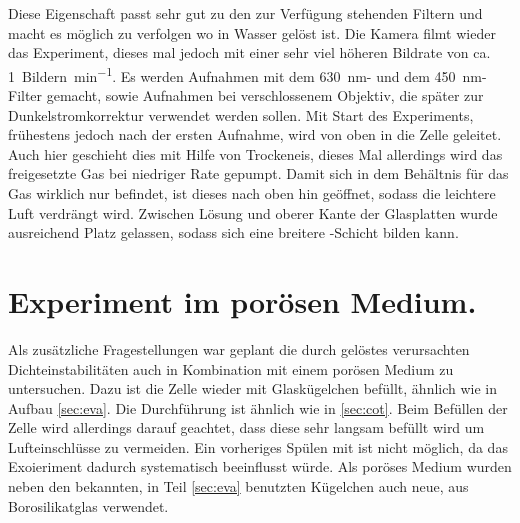 Diese Eigenschaft passt sehr gut zu den zur Verfügung stehenden Filtern und macht es möglich zu verfolgen wo \COT in Wasser gelöst ist.
Die Kamera filmt wieder das Experiment, dieses mal jedoch mit einer sehr viel höheren Bildrate von ca. \SI{1}{Bildern\per\minute}.  Es werden Aufnahmen mit dem \SI{630}{\nano\meter}- und dem \SI{450}{\nano\meter}-Filter gemacht, sowie Aufnahmen bei verschlossenem Objektiv, die später zur Dunkelstromkorrektur verwendet werden sollen. 
Mit Start des Experiments, frühestens jedoch nach der ersten Aufnahme, wird von oben \COT in die Zelle geleitet. Auch hier geschieht dies mit Hilfe von Trockeneis, dieses Mal allerdings wird das freigesetzte Gas bei niedriger Rate gepumpt. Damit sich in dem Behältnis für das Gas wirklich nur \COT befindet, ist dieses nach oben hin geöffnet, sodass die leichtere Luft verdrängt wird. Zwischen Lösung und oberer Kante der Glasplatten wurde ausreichend Platz gelassen, sodass sich eine breitere \COT-Schicht bilden kann.

\section{\COT Experiment im porösen Medium.}
\label{sec:cpm}
Als zusätzliche Fragestellungen war geplant die durch gelöstes \COT verursachten Dichteinstabilitäten auch in Kombination mit einem porösen Medium zu untersuchen. Dazu ist die Zelle wieder mit Glaskügelchen befüllt, ähnlich wie in Aufbau \ref{sec:eva}.
Die Durchführung ist ähnlich wie in \ref{sec:cot}. Beim Befüllen der Zelle wird allerdings darauf geachtet, dass diese sehr langsam befüllt wird um Lufteinschlüsse zu vermeiden. Ein vorheriges Spülen mit \COT ist nicht möglich, da das Exoieriment dadurch systematisch beeinflusst würde.
Als poröses Medium wurden neben den bekannten, in Teil \ref{sec:eva} benutzten Kügelchen auch neue, aus Borosilikatglas verwendet.

